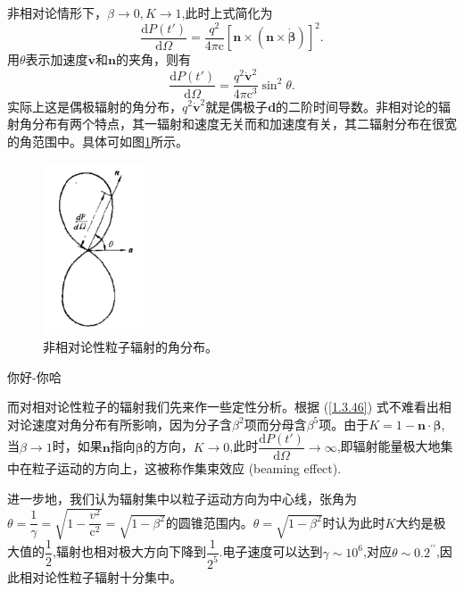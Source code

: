 \documentclass[../天体物理基础.tex]{subfiles}
\begin{document}
非相对论情形下，$\beta\to0,K\to1$,此时上式简化为
\begin{equation}
\frac{\mathrm{d}P\left(t'\right)}{\mathrm{d}\Omega}=\frac{q^{2}}{4\pi\mathrm{c}}\left[\boldsymbol{n}\times\left(\boldsymbol{n}\times\dot{\boldsymbol{\beta}}\right)\right]^{2}.
\end{equation}
用$\theta$表示加速度$\dot{\boldsymbol{v}}$和$\boldsymbol{n}$的夹角，则有
\begin{equation}
\frac{\mathrm{d}P\left(t'\right)}{\mathrm{d}\Omega}=\frac{q^{2}\dot{\boldsymbol{v}}^{2}}{4\pi\mathrm{c}^{3}}\sin^{2}\theta.
\end{equation}
实际上这是偶极辐射的角分布，$q^{2}\dot{\boldsymbol{v}}^{2}$就是偶极子$\boldsymbol{d}$的二阶时间导数。非相对论的辐射角分布有两个特点，其一辐射和速度无关而和加速度有关，其二辐射分布在很宽的角范围中。具体可如图\ref{非相对论性粒子辐射的角分布。}所示。
\begin{figure}[!htbp]
\centering
\includegraphics[width=3cm]{figures/figure1_5.png}
\captionsetup{justification=raggedright, singlelinecheck=false}
\caption{非相对论性粒子辐射的角分布。}
\label{非相对论性粒子辐射的角分布。}
\end{figure}

你好{}-{}你哈

而对相对论性粒子的辐射我们先来作一些定性分析。根据 (\ref{1.3.46}) 式不难看出相对论速度对角分布有所影响，因为分子含$\beta^{2}$项而分母含$\beta^{5}$项。由于$K=1-\boldsymbol{n}\cdot\boldsymbol{\beta}$,当$\beta\to1$时，如果$\boldsymbol{n}$指向$\boldsymbol{\beta}$的方向，$K\to0$,此时$\dfrac{\mathrm{d}P\left(t'\right)}{\mathrm{d}\Omega}\to\infty$,即辐射能量极大地集中在粒子运动的方向上，这被称作集束效应 (beaming effect).

进一步地，我们认为辐射集中以粒子运动方向为中心线，张角为$\theta=\dfrac{1}{\gamma}=\sqrt{1-\dfrac{v^{2}}{\mathrm{c}^{2}}}=\sqrt{1-\beta^{2}}$的圆锥范围内。$\theta=\sqrt{1-\beta^{2}}$时认为此时$K$大约是极大值的$\dfrac{1}{2}$,辐射也相对极大方向下降到$\dfrac{1}{2^{5}}$.电子速度可以达到$\gamma\sim10^{6}$,对应$\theta\sim0.2^{\prime\prime}$,因此相对论性粒子辐射十分集中。
\end{document}
